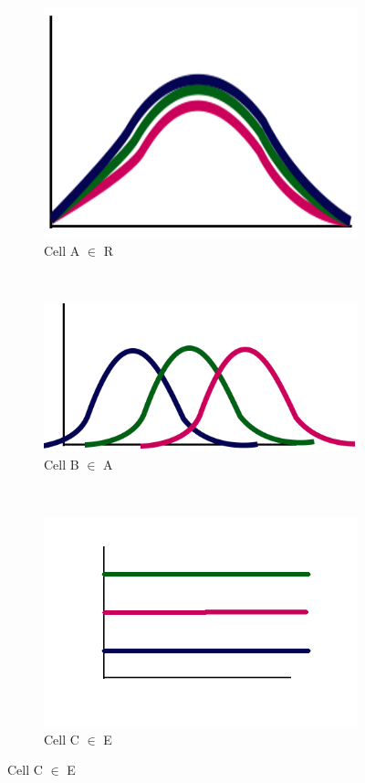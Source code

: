 \documentclass[english,11pt]{article}
\begin{document}
\begin{figure}[H]
        \centering
        \begin{subfigure}[b]{0.3\textwidth}
                \centering
				\includegraphics[width=\textwidth]{Cell-A.png}
                \caption{Cell A $\in$ R}
        \end{subfigure}%
        ~
        \begin{subfigure}[b]{0.3\textwidth}
                \centering
				\includegraphics[width=\textwidth]{Cell-B.png}
                \caption{Cell B $\in$ A}
        \end{subfigure}
        ~ 
        \begin{subfigure}[b]{0.3\textwidth}
                \centering
                \includegraphics[width=\textwidth]{Cell-C.png}
				\caption{Cell C $\in$ E}
        \end{subfigure}
\end{figure}
\end{document}
